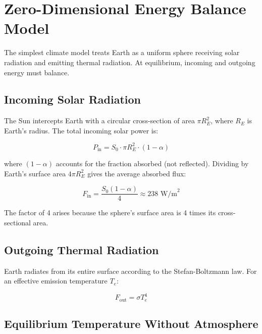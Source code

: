 \documentclass[11pt,a4paper]{article}
\begin{document}
\section{Zero-Dimensional Energy Balance Model}

The simplest climate model treats Earth as a uniform sphere receiving solar radiation and emitting thermal radiation. At equilibrium, incoming and outgoing energy must balance.

\subsection{Incoming Solar Radiation}

The Sun intercepts Earth with a circular cross-section of area $\pi R_E^2$, where $R_E$ is Earth's radius. The total incoming solar power is:

\begin{equation}
P_{\text{in}} = S_0 \cdot \pi R_E^2 \cdot (1 - \alpha)
\end{equation}

where $(1-\alpha)$ accounts for the fraction absorbed (not reflected). Dividing by Earth's surface area $4\pi R_E^2$ gives the average absorbed flux:

\begin{equation}
F_{\text{in}} = \frac{S_0 (1 - \alpha)}{4} \approx 238 \text{ W/m}^2
\label{eq:incoming}
\end{equation}

The factor of 4 arises because the sphere's surface area is 4 times its cross-sectional area.

\subsection{Outgoing Thermal Radiation}

Earth radiates from its entire surface according to the Stefan-Boltzmann law. For an effective emission temperature $T_e$:

\begin{equation}
F_{\text{out}} = \sigma T_e^4
\label{eq:outgoing}
\end{equation}

\subsection{Equilibrium Temperature Without Atmosphere}
\end{document}
